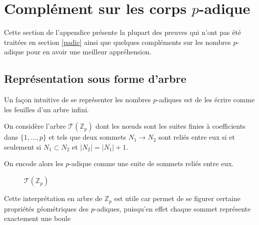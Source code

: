 \section{Complément sur les corps \texorpdfstring{$p$}{p}-adique}
\label{cpadic}

Cette section de l'appendice présente la plupart des preuves qui n'ont pas été traitées en section \ref{padic} ainsi que quelques compléments sur les nombres $p$-adique pour en avoir une meilleur appréhension.


\subsection*{Représentation sous forme d'arbre}
Un façon intuitive de se représenter les nombres $p$-adiques est de les écrire comme les feuilles d'un arbre infini.

On considère l'arbre $\mathcal{T}(\mathbb{Z}_p)$ dont les nœuds sont les suites finies à coefficients dans $\{1,\ldots,p\} $ et tels que deux sommets $N_1 \to N_2$ sont reliés entre eux si et seulement si $N_1 \subset N_2$ et $|N_2| = |N_1| + 1$. 

On encode alors les $p$-adique comme une suite de sommets reliés entre eux.


\begin{figure}[htpb]
	\centering
	 
	\caption{$\mathcal{T}\left( \mathbb{Z}_p \right) $}
	\label{fig:TZp} 
\end{figure}



Cette interprétation en arbre de $\mathbb{Z}_p$ est utile car permet de se figurer certaine propriétés géométriques des $p$-adiques, puisqu'en effet chaque sommet représente exactement une boule 



